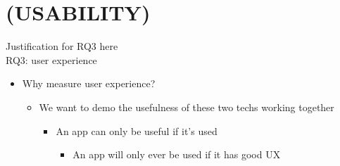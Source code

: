 \chapter{(USABILITY)} \label{usability}

Justification for RQ3 here \\
RQ3: user experience
\begin{itemize}
	\item{Why measure user experience?}
	\begin{itemize}
		\item{We want to demo the usefulness of these two techs working together}
		\begin{itemize}
			\item{An app can only be useful if it's used}
			\begin{itemize}
				\item{An app will only ever be used if it has good UX}
			\end{itemize}
		\end{itemize}
	\end{itemize}
\end{itemize}
